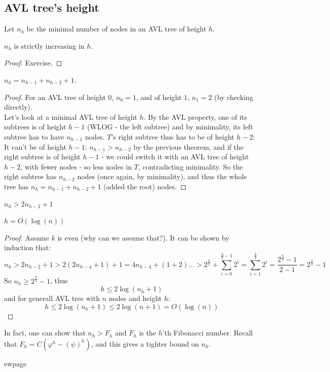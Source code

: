 \subsection{AVL tree's height}
Let $n_h$ be the minimal number of nodes in an AVL tree of height
$h$.\\
\begin{thm}
    $n_h$ is strictly increasing in $h$.
\end{thm}
\begin{proof} Exercise.
\end{proof}
\begin{thm}
$n_{h} = n_{h-1} + n_{h-2} + 1$.
\end{thm}
\begin{proof}For an AVL tree of height $0$, $n_0 = 1$,
and of height $1$, $n_1 = 2 $ (by checking directly).\\
    Let's look at a minimal AVL tree of height $h$. By the AVL property, one
of its subtrees is of height $h-1$ (WLOG - the left subtree) and by
minimality, its left subtree has to have $n_{h-1}$ nodes. $T$'s right subtree
thus has to be of height $h-2$: It can't be of height $h-1$: $n_{h-1} >
n_{h-2}$ by the previous theorem, and if the right subtree is of height $h-1$ -
we could switch it with an AVL tree of height $h-2$, with fewer nodes - so
less nodes in $T$, contradicting minimality. So the right subtree has
$n_{h-2}$ nodes (once again, by minimality), and thus the whole tree has
    $n_{h} = n_{h-1} + n_{h-2} + 1$ (added the root) nodes.
\end{proof}
\begin{cor}$n_h > 2n_{h-2} + 1$
\end{cor}
\begin{cor}$h = O(\log(n))$
\end{cor}
\begin{proof}
    Assume $k$ is even (why can we assume that?).
    It can be shown by induction that:
    \[
        n_h>2n_{h-2}+1>2(2n_{h-4}+1)+1=4n_{h-4}+(1+2)\ldots >
        2^{\frac{h}{2}}+\sum_{i=0}^{\frac{h}{2}-1}
        2^i=\sum_{i=1}^{\frac{h}{2}}2^i = \frac{2^\frac{h}{2} - 1}{2-1} =  2^{\frac{h}{2}} - 1
    \]
    So $n_h \geq 2^{\frac{h}{2}} - 1$, thus
    \[
        h\leq 2\log(n_h + 1)
    \]
    and for generall AVL tree with $n$ nodes and height $h$:
    \[
         h\leq 2\log(n_h + 1) \leq 2\log(n + 1) = O(\log(n))
    \]
\end{proof}
\begin{remark}
    In fact, one can show that $n_h > F_h$ and $F_h$ is the $h$'th Fibonacci
    number. Recall that $F_h = C(\varphi^h - (\psi)^h)$, and this gives a
    tighter bound on $n_h$.
\end{remark}


ewpage